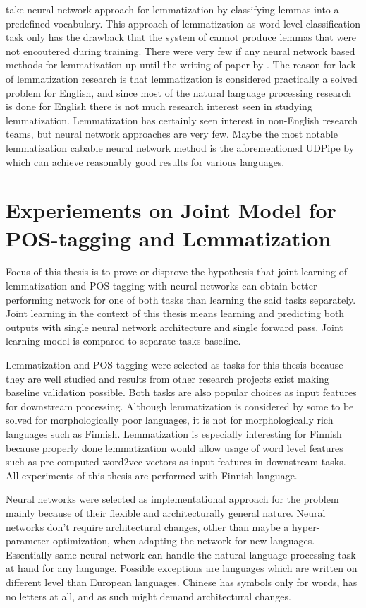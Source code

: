 \documentclass[12pt,a4paper,english
]{tutthesis}
\begin{document}
\cite{Kestemont2016} take neural network approach for lemmatization by classifying lemmas into a predefined vocabulary. This approach of lemmatization as word level classification task only has the drawback that the system of \cite{Kestemont2016} cannot produce lemmas that were not encoutered during training. There were very few if any neural network based methods for lemmatization up until the writing of paper by \cite{Kestemont2016}. The reason for lack of lemmatization research is that lemmatization is considered practically a solved problem for English, and since most of the natural language processing research is done for English there is not much research interest seen in studying lemmatization. Lemmatization has certainly seen interest in non-English research teams, but neural network approaches are very few. Maybe the most notable lemmatization cabable neural network method is the aforementioned UDPipe by \cite{Straka2016} which can achieve reasonably good results for various languages. 


\chapter{Experiements on Joint Model for POS-tagging and Lemmatization}
\label{ch:experiements_on_joint_model_for_pos_tagging_and_lemmatization}
Focus of this thesis is to prove or disprove the hypothesis that joint learning of lemmatization and POS-tagging with neural networks can obtain better performing network for one of both tasks than learning the said tasks separately. Joint learning in the context of this thesis means learning and predicting both outputs with single neural network architecture and single forward pass. Joint learning model is compared to separate tasks baseline.

Lemmatization and POS-tagging were selected as tasks for this thesis because they are well studied and results from other research projects exist making baseline validation possible. Both tasks are also popular choices as input features for downstream processing. Although lemmatization is considered by some to be solved for morphologically poor languages, it is not for morphologically rich languages such as Finnish. Lemmatization is especially interesting for Finnish because properly done lemmatization would allow usage of word level features such as pre-computed word2vec vectors as input features in downstream tasks. All experiments of this thesis are performed with Finnish language.

Neural networks were selected as implementational approach for the problem mainly because of their flexible and architecturally general nature. Neural networks don't require architectural changes, other than maybe a hyper-parameter optimization, when adapting the network for new languages. Essentially same neural network can handle the natural language processing task at hand for any language. Possible exceptions are languages which are written on different level than European languages. Chinese has symbols only for words, has no letters at all, and as such might demand architectural changes.
\end{document}
